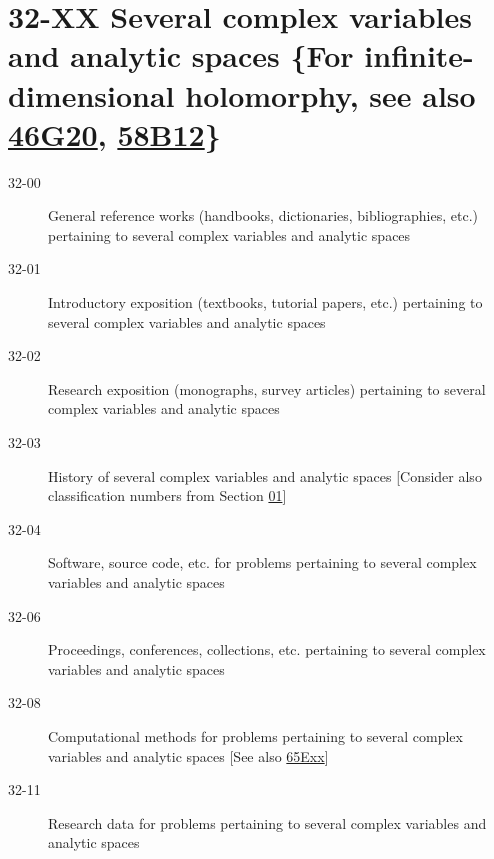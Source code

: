 \section*{32-XX  Several complex variables and analytic spaces \{For infinite-\newline dimensional holomorphy, see also \hyperref[46G20]{46G20}, \hyperref[58B12]{58B12}\} }\label{32-XX}
\begin{description}
\item [32-00]\label{32-00} General reference works (handbooks, dictionaries, bibliographies, etc.) pertaining to several complex variables and analytic spaces
\item [32-01]\label{32-01} Introductory exposition (textbooks, tutorial papers, etc.) pertaining to several complex variables and analytic spaces
\item [32-02]\label{32-02} Research exposition (monographs, survey articles) pertaining to several complex variables and analytic spaces
\item [32-03]\label{32-03} History of several complex variables and analytic spaces [Consider also classification numbers from Section \hyperref[01-XX]{01}]
\item [32-04]\label{32-04} Software, source code, etc. for problems pertaining to several complex variables and analytic spaces
\item [32-06]\label{32-06} Proceedings, conferences, collections, etc. pertaining to several complex variables and analytic spaces
\item [32-08]\label{32-08} Computational methods for problems pertaining to several complex variables and analytic spaces [See also \hyperref[65Exx]{65Exx}]
\item [32-11]\label{32-11} Research data for problems pertaining to several complex variables and analytic spaces
\end{description}
